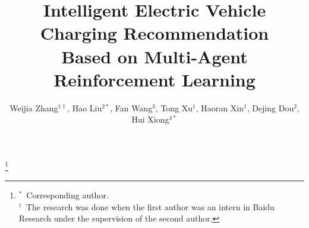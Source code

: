 \documentclass[sigconf]{acmart}
\begin{document}

\title{Intelligent Electric Vehicle Charging Recommendation\\ Based on Multi-Agent Reinforcement Learning}

\author{Weijia Zhang$^{1\dagger}$, Hao Liu$^{2*}$, Fan Wang$^{3}$, Tong Xu$^{1}$, Haoran Xin$^{1}$, Dejing Dou$^{2}$, Hui Xiong$^{4*}$}

\thanks{
    $^{*}$~Corresponding author.\\
    $^{\dagger}$~The research was done when the first author was an intern in Baidu Research under the supervision of the second author.}

\end{document}
